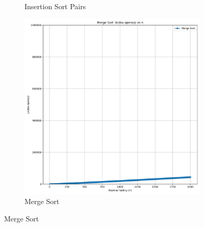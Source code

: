 \documentclass[11pt,a4paper]{article}
\begin{document}
\begin{figure}[h]
\begin{subfigure}{.32\textwidth}
    \caption{Insertion Sort Pairs}
  \end{subfigure}
  \begin{subfigure}{.32\textwidth}
    \centering\includegraphics[width=\linewidth]{merge_sort.png}
    \caption{Merge Sort}
  \end{subfigure}


\end{figure}
\end{document}
